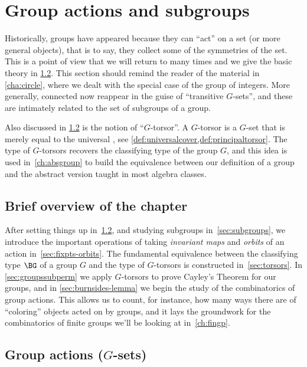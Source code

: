 \chapter{Group actions and subgroups}
\label{ch:actions}

Historically, groups have appeared because they can ``act'' on a set
(or more general objects), that is to say, they collect some of the
symmetries of the set. This is a point of view that we will return to
many times and we give the basic theory in \cref{sec:gsets}.
This section should remind the reader of the material in \cref{cha:circle},
where we dealt with the special case of the group of integers.
More generally, connected \coverings now reappear in the guise of
``transitive $G$-sets'', and these are intimately related to
the set of subgroups of a group.

Also discussed in \cref{sec:gsets} is the notion of ``$G$-torsor''.
A $G$-torsor is a $G$-set that is merely equal to the universal \covering,
see \cref{def:universalcover,def:principaltorsor}.
The type of $G$-torsors recovers the classifying type of the group $G$,
and this idea is used in~\cref{ch:absgroup} to build the equivalence between
our definition of a group and the abstract version taught in most algebra
classes.

\section{Brief overview of the chapter}

After setting things up in~\cref{sec:gsets}, and
studying subgroups in~\cref{sec:subgroups},
we introduce the important
operations of taking \emph{invariant maps} and \emph{orbits} of an action
in~\cref{sec:fixpts-orbits}.
The fundamental equivalence between the classifying type $\BG$ of a group $G$
and the type of $G$-torsors is constructed in~\cref{sec:torsors}. 
In \cref{sec:groupssubperm} we apply $G$-torsors to prove Cayley's Theorem
for our groups, and in \cref{sec:burnsides-lemma} we
begin the study of the combinatorics of group actions.
This allows us to count, for instance, how many ways there are of 
``coloring'' objects acted on by groups,
and it lays the groundwork for the combinatorics of finite groups
we'll be looking at in~\cref{ch:fingp}.

\section{Group actions ($G$-sets)}
\label{sec:gsets}

